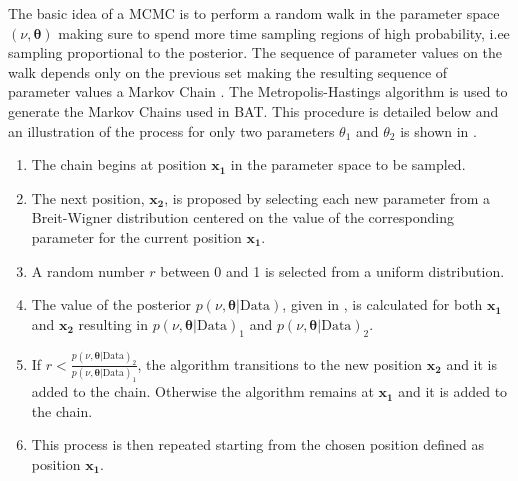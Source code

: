 The basic idea of a MCMC is to perform a random walk in the parameter space
$(\nu,\boldsymbol{\theta})$ making sure to spend more time sampling regions of
high probability, i.ee sampling proportional to the posterior.  The sequence of
parameter values on the walk depends only on the previous set making the
resulting sequence of parameter values a Markov Chain \cite{Markov2006}.  The
Metropolis-Hastings algorithm \cite{10.2307/2334940,Beresford:2642397} is used
to generate the Markov Chains used in BAT.  This procedure is detailed below
and an illustration of the process for only two parameters $\theta_{1}$ and
$\theta_{2}$ is shown in .
%
\begin{enumerate}
\item The chain begins at position $\boldsymbol{x_{1}}$ in the parameter space to be sampled.
\item The next position, $\boldsymbol{x_{2}}$, is proposed by selecting each new parameter from a Breit-Wigner distribution centered on the value of the corresponding parameter for the current position $\boldsymbol{x_{1}}$.
\item A random number $r$ between 0 and 1 is selected from a uniform distribution.
\item The value of the posterior $p(\nu,\boldsymbol{\theta}|\text{Data})$, given in , is calculated for both  $\boldsymbol{x_{1}}$ and  $\boldsymbol{x_{2}}$ resulting in $p(\nu,\boldsymbol{\theta}|\text{Data})_{1}$ and $p(\nu,\boldsymbol{\theta}|\text{Data})_{2}$.
\item If $r < \frac{p(\nu,\boldsymbol{\theta}|\text{Data})_{2}}{p(\nu,\boldsymbol{\theta}|\text{Data})_{1}}$, the algorithm transitions to the new position $\boldsymbol{x_{2}}$ and it is added to the chain. Otherwise the algorithm remains at $\boldsymbol{x_{1}}$ and it is added to the chain.
\item This process is then repeated starting from the chosen position defined as position $\boldsymbol{x_{1}}$.
\end{enumerate}

